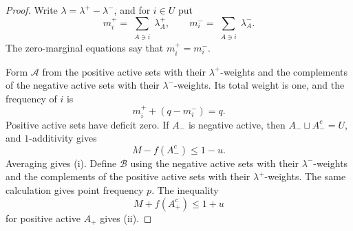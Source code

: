 \documentclass[10pt,a4paper]{amsart}
\newcommand{\cA}{\mathcal A}
\newcommand{\cB}{\mathcal B}
\begin{document}
\begin{proof}
Write \(\lambda=\lambda^+-\lambda^-\), and for \(i\in U\) put
\[
 m_i^+=\sum_{\substack{A\ni i}}\lambda_A^+,
 \qquad
 m_i^-=\sum_{\substack{A\ni i}}\lambda_A^-.
\]
The zero-marginal equations say that \(m_i^+=m_i^-\).

Form \(\cA\) from the positive active sets with their \(\lambda^+\)-weights
and the complements of the negative active sets with their
\(\lambda^-\)-weights.  Its total weight is one, and the frequency of \(i\)
is
\[
        m_i^++(q-m_i^-)=q.
\]
Positive active sets have deficit zero.  If \(A_-\) is negative active, then
\(A_-\sqcup A_-^c=U\), and \(1\)-additivity gives
\[
        M-f(A_-^c)\leqslant1-u.
\]
Averaging gives (i).  Define \(\cB\) using the negative active sets with
their \(\lambda^-\)-weights and the complements of the positive active sets
with their \(\lambda^+\)-weights.  The same calculation gives point
frequency \(p\).
The inequality
\[
        M+f(A_+^c)\leqslant1+u
\]
for positive active \(A_+\) gives (ii).
\end{proof}
\end{document}
